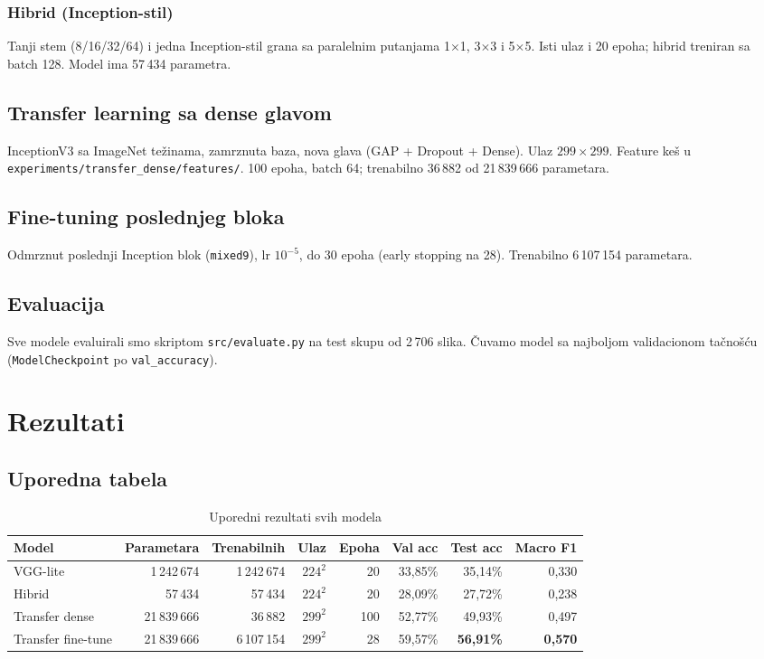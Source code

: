 \documentclass[12pt,a4paper]{article}
\begin{document}
\subsubsection{Hibrid (Inception-stil)}
Tanji stem (8/16/32/64) i jedna Inception-stil grana sa paralelnim putanjama 1$\times$1, 3$\times$3 i 5$\times$5.
Isti ulaz i 20 epoha; hibrid treniran sa batch 128. Model ima 57\,434 parametra.

\subsection{Transfer learning sa dense glavom}
InceptionV3 sa ImageNet težinama, zamrznuta baza, nova glava (GAP + Dropout + Dense).
Ulaz $299\times 299$. Feature keš u \texttt{experiments/transfer\_dense/features/}.
100 epoha, batch 64; trenabilno 36\,882 od 21\,839\,666 parametara.

\subsection{Fine-tuning poslednjeg bloka}
Odmrznut poslednji Inception blok (\texttt{mixed9}), lr $10^{-5}$, do 30 epoha (early stopping na 28).
Trenabilno 6\,107\,154 parametara.

\subsection{Evaluacija}
Sve modele evaluirali smo skriptom \texttt{src/evaluate.py} na test skupu od 2\,706 slika.
Čuvamo model sa najboljom validacionom tačnošću (\texttt{ModelCheckpoint} po \texttt{val\_accuracy}).

\section{Rezultati}

\subsection{Uporedna tabela}

\begin{table}[htbp]
  \centering
  \caption{Uporedni rezultati svih modela}
  \label{tab:results}
  \small
  \begin{tabular}{lrrrrrrr}
    \toprule
    Model & Parametara & Trenabilnih & Ulaz & Epoha & Val acc & Test acc & Macro F1 \\
    \midrule
    VGG-lite           & 1\,242\,674  & 1\,242\,674 & $224^2$ & 20  & 33{,}85\% & 35{,}14\% & 0{,}330 \\
    Hibrid             &     57\,434  &     57\,434 & $224^2$ & 20  & 28{,}09\% & 27{,}72\% & 0{,}238 \\
    Transfer dense     & 21\,839\,666 &     36\,882 & $299^2$ & 100 & 52{,}77\% & 49{,}93\% & 0{,}497 \\
    Transfer fine-tune & 21\,839\,666 &  6\,107\,154 & $299^2$ & 28 & 59{,}57\% & \textbf{56{,}91\%} & \textbf{0{,}570} \\
    \bottomrule
  \end{tabular}
\end{table}
\end{document}
